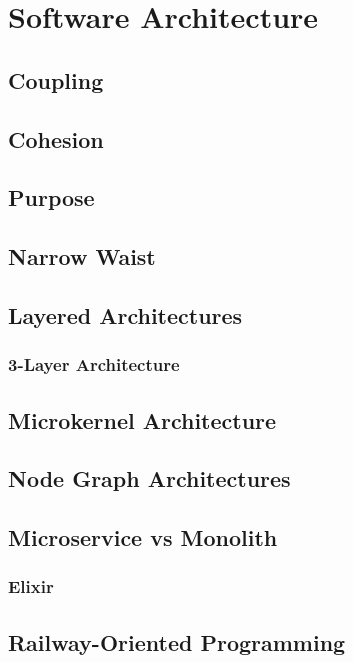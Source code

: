 \chapter{Software Architecture}




\section{Coupling}

\section{Cohesion}

\section{Purpose}

\section{Narrow Waist}

\section{Layered Architectures}

\subsection{3-Layer Architecture}

\section{Microkernel Architecture}

\section{Node Graph Architectures}

\section{Microservice vs Monolith}

\subsection{Elixir}

\section{Railway-Oriented Programming}
\label{sec:swarch:rop}



